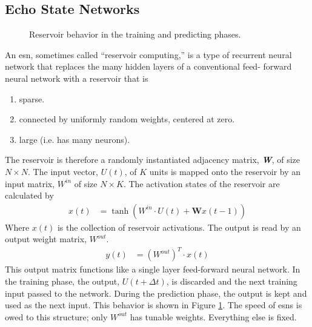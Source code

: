 \subsection{Echo State Networks}

\begin{figure}[htp]
  \centering


  \caption{Reservoir behavior in the training and predicting phases.}
  \label{fig:reservoir_graph}
\end{figure}

An \gls{esn}, sometimes called ``reservoir computing,'' is a type of recurrent
neural network that replaces the many hidden layers of a conventional feed-
forward neural network with a reservoir that is
\begin{enumerate}
  \item sparse.
  \item connected by uniformly random weights, centered at zero.
  \item large (i.e. has many neurons).
\end{enumerate}

The reservoir is therefore a randomly instantiated adjacency matrix,
\textit{\textbf{W}}, of size $N \times N$. The input vector, $U(t)$, of
$K$ units is mapped onto the reservoir by an input matrix,
 $W^{in}$ of size $N \times K$. The activation states of the reservoir are calculated by
 \begin{align}
   x(t) &= \tanh \left(W^{in}\cdot U(t) + \mathbf{W}x(t-1)\right)
 \end{align}
 Where $x(t)$ is the collection of reservoir activations.
 The output is read by an output weight matrix,
 $W^{out}$.
 \begin{align}
   y(t) &= \left(W^{out}\right)^T\cdot x(t)
 \end{align}
 This output matrix functions like a single layer feed-forward
 neural network. In the training phase, the output, $U(t+\Delta t)$, is
 discarded and the next training input passed to the network. During the
 prediction phase, the output is kept and used as the next input. This behavior
 is shown in Figure \ref{fig:reservoir_graph}. The speed of \glspl{esn} is owed
 to this structure; only $W^{out}$ has tunable weights. Everything else is
 fixed.
